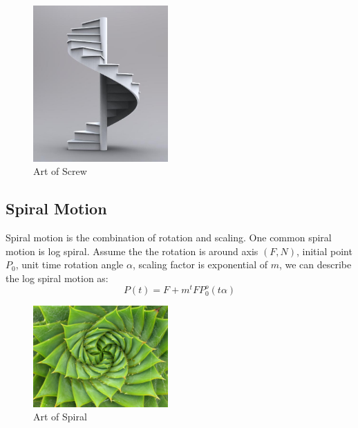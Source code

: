 \documentclass[twoside,11pt]{article}
\begin{document}
\begin{figure}[h!]
  \centering
  \includegraphics[width=0.46\textwidth]{screw}
  \caption{Art of Screw}

\end{figure}

\subsection{Spiral Motion}
Spiral motion is the combination of rotation and scaling. One common spiral motion is log spiral. Assume the the rotation is around axis $(F, N)$, initial point $P_0$, unit time rotation angle $\alpha$, scaling factor is exponential of $m$, we can describe the log spiral motion as:
\begin{equation}
P(t) = F + m^t FP_0^o(t\alpha)
\end{equation}

\begin{figure}[h!]
  \centering
  \includegraphics[width=0.46\textwidth]{spiral}
  \caption{Art of Spiral}

\end{figure}
\end{document}
